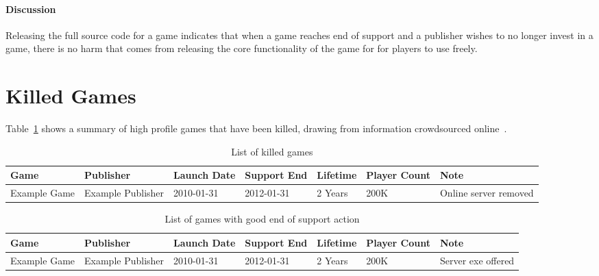 \paragraph*{Discussion}
Releasing the full source code for a game indicates that when a game reaches end of support and a publisher wishes to no longer invest in a game,
there is no harm that comes from releasing the core functionality of the game for for players to use freely.


\section{Killed Games}


Table~\ref{tab:killedgames} shows a summary of high profile games that have been killed, drawing from information crowdsourced online~\cite{dead-games-list-2016}.

\begin{landscape}
\begin{table}[htbp]
    \centering
    \caption{List of killed games}%
    \label{tab:killedgames}
    \begin{tabular*}{1\textwidth}{lllllll}
        Game & Publisher & Launch Date & Support End & Lifetime & Player Count & Note \\ \toprule
        Example Game & Example Publisher & 2010-01-31 & 2012-01-31 & 2 Years & 200K & Online server removed \\
    \end{tabular*}
\end{table}
\end{landscape}

\begin{landscape}
    \begin{table}[htbp]
        \centering
        \caption{List of games with good end of support action}%
        \label{tab:savedgames}
        \begin{tabular*}{1\textwidth}{lllllll}
            Game & Publisher & Launch Date & Support End & Lifetime & Player Count & Note \\ \toprule
            Example Game & Example Publisher & 2010-01-31 & 2012-01-31 & 2 Years & 200K & Server exe offered \\
        \end{tabular*}
    \end{table}
\end{landscape}
